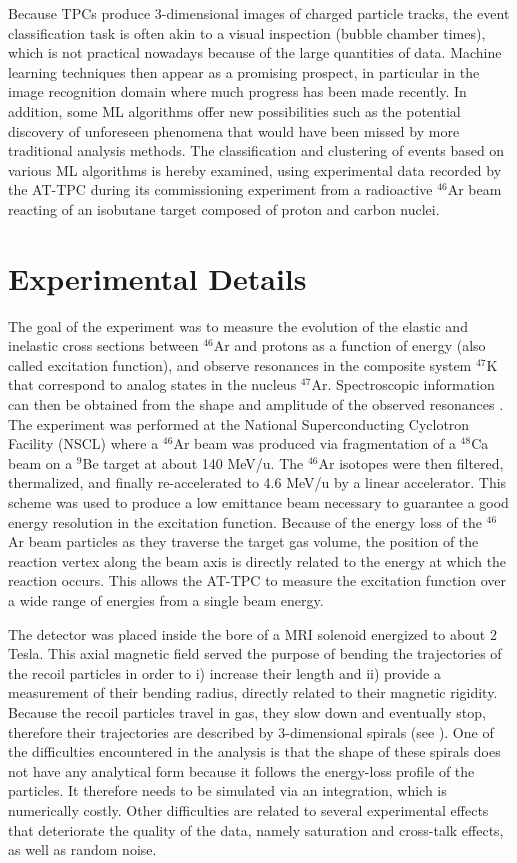 \documentclass[preprint,12pt]{elsarticle}
\begin{document}
Because TPCs produce 3-dimensional images of charged particle tracks, the event classification task is often akin to a visual inspection (bubble chamber times), which is not practical nowadays because of the large quantities of data. Machine learning techniques then appear as a promising prospect, in particular in the image recognition domain where much progress has been made recently. In addition, some ML algorithms offer new possibilities such as the potential discovery of unforeseen phenomena that would have been missed by more traditional analysis methods. The classification and clustering of events based on various ML algorithms is hereby examined, using experimental data recorded by the AT-TPC during its commissioning experiment from a radioactive $^{46}$Ar beam reacting of an isobutane target composed of proton and carbon nuclei. 

\section{Experimental Details} 
The goal of the experiment was to measure the evolution of the elastic and inelastic cross sections between $^{46}$Ar and protons as a function of energy (also called excitation function), and observe resonances in the composite system $^{47}$K that correspond to analog states in the nucleus $^{47}$Ar. Spectroscopic information can then be obtained from the shape and amplitude of the observed resonances \cite{Bradt2018}. 
The experiment was performed at the National Superconducting Cyclotron Facility (NSCL) where a $^{46}$Ar beam was produced via fragmentation of a $^{48}$Ca beam on a $^9$Be target at about 140 MeV/u. The $^{46}$Ar isotopes were then filtered, thermalized, and finally re-accelerated to 4.6 MeV/u by a linear accelerator. This scheme was used to produce a low emittance beam necessary to guarantee a good energy resolution in the excitation function. Because of the energy loss of the $^{46}$Ar beam particles as they traverse the target gas volume, the position of the reaction vertex along the beam axis is directly related to the energy at which the reaction occurs. This allows the AT-TPC to measure the excitation function over a wide range of energies from a single beam energy.

The detector was placed inside the bore of a MRI solenoid energized to about 2 Tesla. This axial magnetic field served the purpose of bending the trajectories of the recoil particles in order to i) increase their length and ii) provide a measurement of their bending radius, directly related to their magnetic rigidity. Because the recoil particles travel in gas, they slow down and eventually stop, therefore their trajectories are described by 3-dimensional spirals (see \cite{Bradt2017}). One of the difficulties encountered in the analysis is that the shape of these spirals does not have any analytical form because it follows the energy-loss profile of the particles. It therefore needs to be simulated via an integration, which is numerically costly. Other difficulties are related to several experimental effects that deteriorate the quality of the data, namely saturation and cross-talk effects, as well as random noise. 
\end{document}
